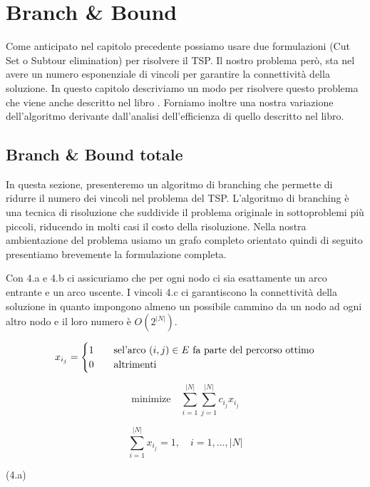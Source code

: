 \chapter{Branch \& Bound}\label{branch_and_bound}

Come anticipato nel capitolo precedente possiamo usare due formulazioni (Cut Set o Subtour elimination) per risolvere il TSP. Il nostro problema però, sta nel avere un numero esponenziale di vincoli per garantire la connettività della soluzione. In questo capitolo descriviamo un modo per risolvere questo problema che viene anche descritto nel libro \cite{bertsimas}. Forniamo inoltre una nostra variazione dell’algoritmo derivante dall’analisi dell’efficienza di quello descritto nel libro.

\section{Branch \& Bound totale}

In questa sezione, presenteremo un algoritmo di branching che permette di ridurre il numero dei vincoli nel problema del TSP. L'algoritmo di branching è una tecnica di risoluzione che suddivide il problema originale in sottoproblemi più piccoli, riducendo in molti casi il costo della risoluzione. Nella nostra ambientazione del problema usiamo un grafo completo orientato quindi di seguito presentiamo brevemente la formulazione completa.

Con 4.a e 4.b ci assicuriamo che per ogni nodo ci sia esattamente un arco entrante e un arco uscente.
I vincoli 4.c ci garantiscono la connettività della soluzione in quanto impongono almeno un possibile cammino da un nodo ad ogni altro nodo e il loro numero è \begin{math}O(2^{|N|})\end{math}.

\[ x_{i_j} =
  \begin{cases}
    1       & \quad \text{se} \text{l'arco \begin{math}(i, j) \in E\end{math} fa parte del percorso ottimo}\\
    0  & \quad \text{altrimenti}
  \end{cases}
\]

\[
\text{minimize} \quad \sum_{i = 1}^{|N|}\sum_{j = 1}^{|N|} c_{i_j} x_{i_j}
\]

\begin{minipage}[t]{0.9\textwidth}
\[
\sum_{i = 1}^{|N|} x_{i_j} = 1, \quad  i = 1, \dots, |N| 
\]
\end{minipage}%
\begin{minipage}[t]{0.1\textwidth}
\vspace{0,4cm}
(4.a)
\end{minipage}

